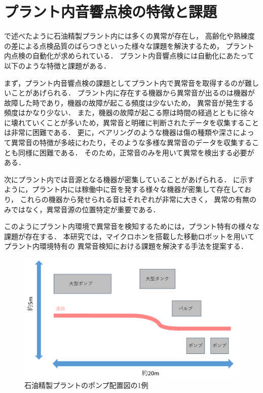 \documentclass[../main]{subfiles}
\begin{document}
\section{プラント内音響点検の特徴と課題}
\label{sec:intro_anomaly-detection}
で述べたように石油精製プラント内には多くの異常が存在し，
高齢化や熟練度の差による点検品質のばらつきといった様々な課題を解決するため，
プラント内点検の自動化が求められている．
プラント内音響点検には自動化にあたって以下のような特徴と課題がある．


まず，プラント内音響点検の課題としてプラント内で異常音を取得するのが難しいことがあげられる．
プラント内に存在する機器から異常音が出るのは機器が故障した時であり，機器の故障が起こる頻度は少ないため，
異常音が発生する頻度はかなり少ない．
また，機器の故障が起こる際は時間の経過とともに徐々に壊れていくことが多いため，異常音と明確に判断されたデータを収集することは非常に困難である．
更に，ベアリングのような機器は傷の種類や深さによって異常音の特徴が多岐にわたり，そのような多様な異常音のデータを収集することも同様に困難である．
そのため，正常音のみを用いて異常を検出する必要がある．

次にプラント内では音源となる機器が密集していることがあげられる．
に示すように，プラント内には稼働中に音を発する様々な機器が密集して存在しており，
これらの機器から発せられる音はそれぞれが非常に大きく，
異常の有無のみではなく，異常音源の位置特定が重要である．

このようにプラント内環境で異常音を検知するためには，プラント特有の様々な課題が存在する．
本研究では，マイクロホンを搭載した移動ロボットを用いてプラント内環境特有の
異常音検知における課題を解決する手法を提案する．

\begin{figure}[t]
  \centering
  \includegraphics[keepaspectratio, width=1.0\linewidth]{chap1/pump_location.png}
  \caption{石油精製プラントのポンプ配置図の1例}
  \label{fig:pump_location}
\end{figure}
\end{document}
